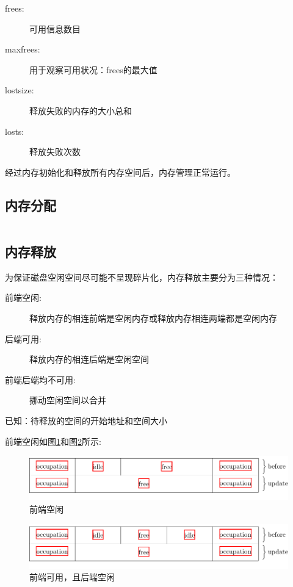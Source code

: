 \documentclass{swfcthesis}
\begin{document}
		\begin{description}
			\item[frees:]可用信息数目
			\item[maxfrees:]用于观察可用状况：frees的最大值
			\item[lostsize:]释放失败的内存的大小总和
			\item[losts:]释放失败次数
		\end{description}
		
		经过内存初始化和释放所有内存空间后，内存管理正常运行。
		
		\subsection{内存分配}

		\begin{listing}[H]
			\inputminted[tabsize=2, firstline=68, lastline=80,
			linenos=true]{c}{../ZOS/src/kernel/memory.c}
		\end{listing}
		
		\subsection{内存释放}

		为保证磁盘空闲空间尽可能不呈现碎片化，内存释放主要分为三种情况：

		\begin{description}
			\item[前端空闲:]释放内存的相连前端是空闲内存或释放内存相连两端都是空闲内存
			\item[后端可用:]释放内存的相连后端是空闲空间
			\item[前端后端均不可用:]挪动空闲空间以合并
		\end{description}

		已知：待释放的空间的开始地址和空间大小
		
		\newpage

		前端空闲如图\ref{fig:mem0}和图\ref{fig:mem1}所示: 

		\begin{figure}[h]
			\centering
			\includegraphics[width=.8\textwidth]{fig/mem0.pdf}
			\caption{前端空闲}
			\label{fig:mem0}
		\end{figure}

		\begin{figure}[h]
			\centering
			\includegraphics[width=.8\textwidth]{fig/mem1.pdf}
			\caption{前端可用，且后端空闲}
			\label{fig:mem1}
		\end{figure}
\end{document}
